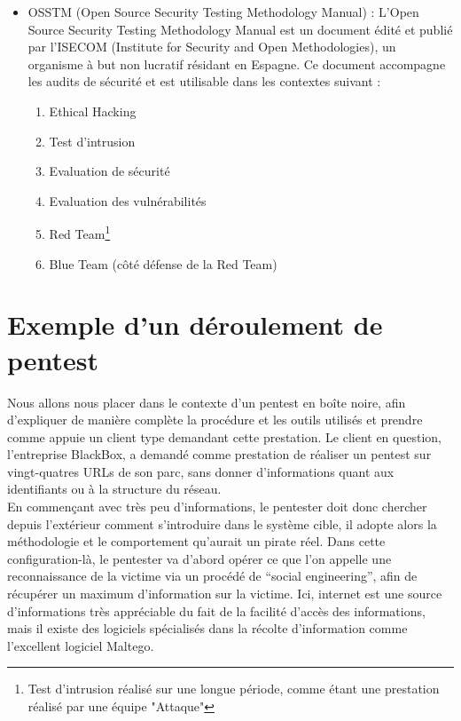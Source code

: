 \documentclass[a4paper]{memoir}
\begin{document}
\begin{itemize}
\item OSSTM (Open Source Security Testing Methodology Manual) : L’Open Source Security Testing Methodology Manual est un document édité et publié par l’ISECOM (Institute for Security and Open Methodologies), un organisme à but non lucratif résidant en Espagne. Ce document accompagne les audits de sécurité et est utilisable dans les contextes suivant : 
	
	
\begin{enumerate}
\item Ethical Hacking
\item Test d'intrusion
\item Evaluation de sécurité
\item Evaluation des vulnérabilités
\item Red Team\footnote{Test d'intrusion réalisé sur une longue période, comme étant une prestation réalisé par une équipe "Attaque"}
\item Blue Team (côté défense de la Red Team)\\
\end{enumerate}
\end{itemize}

\newpage

\section{Exemple d'un déroulement de pentest}

Nous allons nous placer dans le contexte d'un pentest en boîte noire, afin d'expliquer de manière complète la procédure et les outils utilisés et prendre comme appuie un client type demandant cette prestation. Le client en question, l'entreprise BlackBox, a demandé comme prestation de réaliser un pentest sur vingt-quatres URLs de son parc, sans donner d'informations quant aux identifiants ou à la structure du réseau.\\

En commençant avec très peu d’informations, le pentester doit donc chercher depuis l'extérieur comment s’introduire dans le système cible, il adopte alors la méthodologie et le comportement qu’aurait un pirate réel. 
Dans cette configuration-là, le pentester va d'abord opérer ce que l'on appelle une reconnaissance de la victime via un procédé de ``social engineering'', afin de récupérer un maximum d'information sur la victime. Ici, internet est une source d'informations très appréciable du fait de la facilité d'accès des informations, mais il existe des logiciels spécialisés dans la récolte d'information comme l'excellent logiciel Maltego.\\
\end{document}
